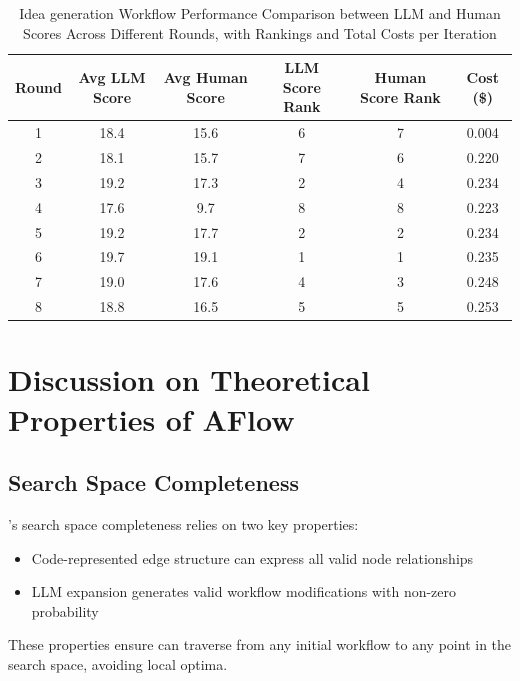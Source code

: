 \begin{table}[h]
\renewcommand\arraystretch{1.2}
\setlength{\arrayrulewidth}{0.8pt}
\setlength{\tabcolsep}{4pt}
\setlength{\abovecaptionskip}{0.1cm}
\setlength{\belowcaptionskip}{-0.2cm}
\centering
\begin{tabular*}{\textwidth}{@{\extracolsep{\fill}}cccccc@{}}  
\hline
Round & Avg LLM Score & Avg Human Score & LLM Score Rank & Human Score Rank & Cost (\$) \\
\hline
1 & 18.4 & 15.6 & 6 & 7 & 0.004 \\
2 & 18.1 & 15.7 & 7 & 6 & 0.220 \\
3 & 19.2 & 17.3 & 2 & 4 & 0.234 \\
4 & 17.6 & 9.7  & 8 & 8 & 0.223 \\
5 & 19.2 & 17.7 & 2 & 2 & 0.234 \\
6 & 19.7 & 19.1 & 1 & 1 & 0.235 \\
7 & 19.0 & 17.6 & 4 & 3 & 0.248 \\
8 & 18.8 & 16.5 & 5 & 5 & 0.253 \\
\hline
\end{tabular*}
\caption{Idea generation Workflow Performance Comparison between LLM and Human Scores Across Different Rounds, with Rankings and Total Costs per Iteration}
\label{tab:idea-workflow-performance}
\end{table}


\section{Discussion on Theoretical Properties of AFlow}
\label{appendix:theroy}

\subsection{Search Space Completeness}
\model's search space completeness relies on two key properties:
\begin{itemize}[leftmargin=20pt]
\item Code-represented edge structure can express all valid node relationships
\item LLM expansion generates valid workflow modifications with non-zero probability
\end{itemize}
These properties ensure \model can traverse from any initial workflow to any point in the search space, avoiding local optima.

